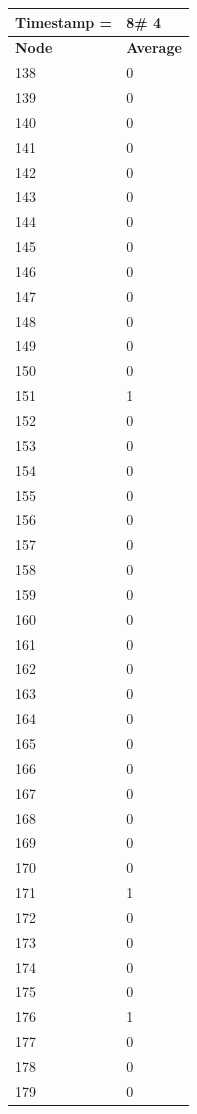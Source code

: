 \begin{tabular}{|l||l|}
\hline
\textbf{Timestamp =} & \textbf{8}\# 4\\\hline
	\textbf{Node} & \textbf{Average} \\ \hline
\hline
	138 & 0 \\ \hline
	139 & 0 \\ \hline
	140 & 0 \\ \hline
	141 & 0 \\ \hline
	142 & 0 \\ \hline
	143 & 0 \\ \hline
	144 & 0 \\ \hline
	145 & 0 \\ \hline
	146 & 0 \\ \hline
	147 & 0 \\ \hline
	148 & 0 \\ \hline
	149 & 0 \\ \hline
	150 & 0 \\ \hline
	151 & 1 \\ \hline
	152 & 0 \\ \hline
	153 & 0 \\ \hline
	154 & 0 \\ \hline
	155 & 0 \\ \hline
	156 & 0 \\ \hline
	157 & 0 \\ \hline
	158 & 0 \\ \hline
	159 & 0 \\ \hline
	160 & 0 \\ \hline
	161 & 0 \\ \hline
	162 & 0 \\ \hline
	163 & 0 \\ \hline
	164 & 0 \\ \hline
	165 & 0 \\ \hline
	166 & 0 \\ \hline
	167 & 0 \\ \hline
	168 & 0 \\ \hline
	169 & 0 \\ \hline
	170 & 0 \\ \hline
	171 & 1 \\ \hline
	172 & 0 \\ \hline
	173 & 0 \\ \hline
	174 & 0 \\ \hline
	175 & 0 \\ \hline
	176 & 1 \\ \hline
	177 & 0 \\ \hline
	178 & 0 \\ \hline
	179 & 0 \\ \hline
\end{tabular}

